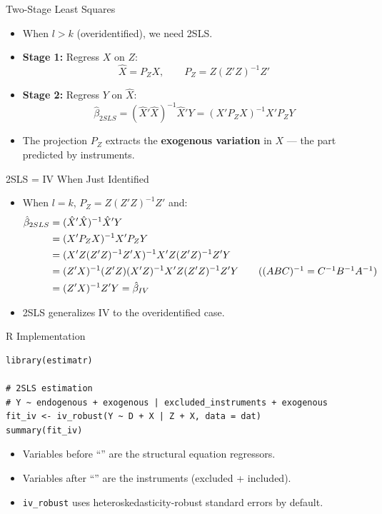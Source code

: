 \documentclass[aspectratio=169, handout]{beamer}
\numberwithin{equation}{section}
\begin{document}
\begin{frame}{Two-Stage Least Squares}
\begin{itemize}
\item When $l>k$ (overidentified), we need 2SLS.
\item \textbf{Stage 1:}  Regress $X$ on $Z$:
$$\hat{X} = P_Z X, \qquad P_Z = Z(Z'Z)^{-1}Z'$$
\item \textbf{Stage 2:}  Regress $Y$ on $\hat{X}$:
$$\hat{\beta}_{2SLS} = (\hat{X}'\hat{X})^{-1}\hat{X}'Y = (X'P_ZX)^{-1}X'P_ZY$$
\item The projection $P_Z$ extracts the \textbf{exogenous variation} in $X$ --- the part predicted by instruments.
\end{itemize}
\end{frame}


\begin{frame}{2SLS = IV When Just Identified}
\begin{itemize}
\item When $l=k$, $P_Z = Z(Z'Z)^{-1}Z'$ and:
\begin{align*}
\hat{\beta}_{2SLS}&=(\hat{X}'\hat{X})^{-1}\hat{X}'Y\\
&=(X'P_ZX)^{-1}X'P_ZY\\
&=(X'Z(Z'Z)^{-1}Z'X)^{-1}X'Z(Z'Z)^{-1}Z'Y\\
&=(Z'X)^{-1}(Z'Z)(X'Z)^{-1}X'Z(Z'Z)^{-1}Z'Y \tag{$(ABC)^{-1}=C^{-1}B^{-1}A^{-1}$}\\
&=(Z'X)^{-1}Z'Y = \hat{\beta}_{IV}
\end{align*}
\item 2SLS generalizes IV to the overidentified case.
\end{itemize}
\end{frame}


\begin{frame}[fragile]{R Implementation}
\begin{lstlisting}
library(estimatr)

# 2SLS estimation
# Y ~ endogenous + exogenous | excluded_instruments + exogenous
fit_iv <- iv_robust(Y ~ D + X | Z + X, data = dat)
summary(fit_iv)
\end{lstlisting}
\begin{itemize}
\item Variables before ``\textbar'' are the structural equation regressors.
\item Variables after ``\textbar'' are the instruments (excluded + included).
\item \texttt{iv\_robust} uses heteroskedasticity-robust standard errors by default.
\end{itemize}
\end{frame}
\end{document}
